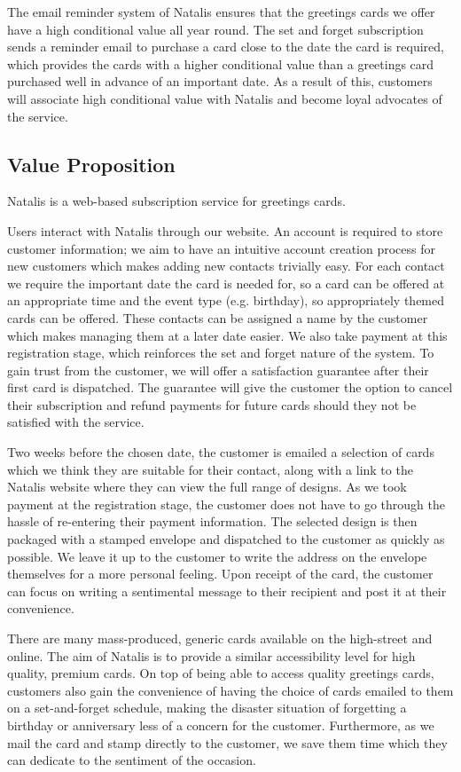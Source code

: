 \documentclass[10pt,a4paper]{article}
\begin{document}
The email reminder system of Natalis ensures that the greetings cards we offer have a high conditional value all year round. The set and forget subscription sends a reminder email to purchase a card close to the date the card is required, which provides the cards with a higher conditional value than a greetings card purchased well in advance of an important date. As a result of this, customers will associate high conditional value with Natalis and become loyal advocates of the service.

\subsection*{Value Proposition}
Natalis is a web-based subscription service for greetings cards.

Users interact with Natalis through our website. An account is required to store customer information; we aim to have an intuitive account creation process for new customers which makes adding new contacts trivially easy. For each contact we require the important date the card is needed for, so a card can be offered at an appropriate time and the event type (e.g. birthday), so appropriately themed cards can be offered. These contacts can be assigned a name by the customer which makes managing them at a later date easier. We also take payment at this registration stage, which reinforces the set and forget nature of the system. To gain trust from the customer, we will offer a satisfaction guarantee after their first card is dispatched. The guarantee will give the customer the option to cancel their subscription and refund payments for future cards should they not be satisfied with the service.

Two weeks before the chosen date, the customer is emailed a selection of cards which we think they are suitable for their contact, along with a link to the Natalis website where they can view the full range of designs. As we took payment at the registration stage, the customer does not have to go through the hassle of re-entering their payment information. The selected design is then packaged with a stamped envelope and dispatched to the customer as quickly as possible. We leave it up to the customer to write the address on the envelope themselves for a more personal feeling. Upon receipt of the card, the customer can focus on writing a sentimental message to their recipient and post it at their convenience.

There are many mass-produced, generic cards available on the high-street and online. The aim of Natalis is to provide a similar accessibility level for high quality, premium cards. On top of being able to access quality greetings cards, customers also gain the convenience of having the choice of cards emailed to them on a set-and-forget schedule, making the disaster situation of forgetting a birthday or anniversary less of a concern for the customer. Furthermore, as we mail the card and stamp directly to the customer, we save them time which they can dedicate to the sentiment of the occasion.
\end{document}
